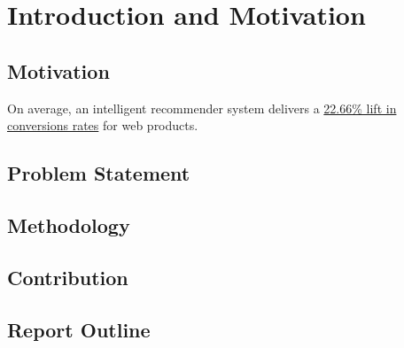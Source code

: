 \chapter{Introduction and Motivation}
\minitoc

\section{Motivation}

On average, an intelligent recommender system delivers a \underline{22.66\% lift in conversions rates} \cite{salesforce2014predictive} for web products.

\section{Problem Statement}

\section{Methodology}

\section{Contribution}

\section{Report Outline}
